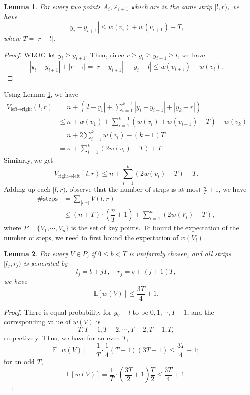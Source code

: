 \documentclass[11pt]{article}
\theoremstyle{plain}
\newtheorem{lemma}{Lemma}[section]
\begin{document}
\begin{lemma}
    \label{ineq}
For every two points $A_i,A_{i+1}$ which are in the same strip $[l,r)$, we have
$$|y_i-y_{i+1}|\le w(v_i)+w(v_{i+1})-T,$$
where $T=|r-l|$.
\end{lemma}
\begin{proof}
WLOG let $y_i\ge y_{i+1}$. Then, since $r\ge y_i\ge y_{i+1}\ge l$, we have
$$|y_i-y_{i+1}|+|r-l|=|r-y_{i+1}|+|y_i-l|\le w(v_{i+1})+w(v_i).$$
\end{proof}

Using Lemma \ref{ineq}, we have
\begin{align*}
V_{\text{left}\to \text{right}}(l,r) &= n+\left(|l-y_1|+\sum\limits_{i=1}^{k-1} |y_{i}-y_{i+1}|+|y_k-r|\right)\\
&\le n + w(v_1) + \sum\limits_{i=1}^{k-1} (w(v_i)+w(v_{i+1})-T) + w(v_k)\\
&= n + 2\sum\limits_{i=1}^{k} w(v_i) - (k-1)T\\
&= n + \sum\limits_{i=1}^k (2w(v_i)-T) + T. 
\end{align*}
Similarly, we get
$$V_{\text{right}\to \text{left}}(l,r)\le n + \sum\limits_{i=1}^k (2w(v_i)-T) + T. $$
Adding up each $[l,r)$, observe that the number of strips is at most $\frac{n}{T}+1$, we have
\begin{align*}
\#\text{steps} &= \sum\limits_{[l,r)} V(l,r)\\
&\le (n+T)\cdot \left(\dfrac{n}{T}+1\right)+\sum\limits_{i=1}^n (2w(V_i)-T),
\end{align*}
where $P=\{V_1,\cdots,V_n\}$ is the set of key points. To bound the expectation of the number of steps, we need to first bound the expectation of $w(V_i)$.

\begin{lemma}
    \label{lemma5.3}
For every $V\in P$, if $0\le b<T$ is uniformly chosen, and all strips $[l_j,r_j)$ is generated by
$$l_j=b+jT,\quad r_j=b+(j+1)T,$$
we have
$$\mathbb{E}[w(V)]\le \dfrac{3T}{4}+1.$$
\end{lemma}
\begin{proof}
There is equal probability for $y_V-l$ to be $0,1,\cdots,T-1$, and the corresponding value of $w(V)$ is
$$T,T-1,T-2,\cdots,T-2,T-1,T,$$
respectively. Thus, we have for an even $T$,
$$\mathbb{E}[w(V)]=\dfrac{1}{T}\cdot \dfrac{1}{4}(T+1)(3T-1)\le \dfrac{3T}{4}+1;$$
for an odd $T$,
$$\mathbb{E}[w(V)]=\dfrac{1}{T}\cdot (\dfrac{3T}{2}+1)\dfrac{T}{2}\le \dfrac{3T}{4}+1.$$
\end{proof}
\end{document}
